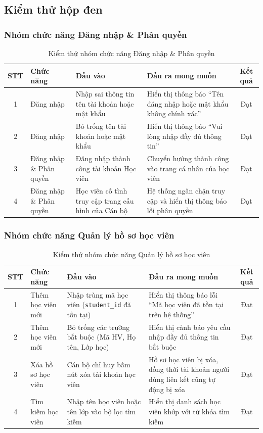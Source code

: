 \documentclass[../DoAn.tex]{subfiles}
\begin{document}
\subsection{Kiểm thử hộp đen}

\subsubsection{Nhóm chức năng Đăng nhập \& Phân quyền}
\begin{table}[H]
\centering
\begin{tabular}{|c|p{3.2cm}|p{3.5cm}|p{5.5cm}|c|}
\hline
\textbf{STT} & \textbf{Chức năng} & \textbf{Đầu vào} & \textbf{Đầu ra mong muốn} & \textbf{Kết quả} \\ \hline
1 & Đăng nhập & Nhập sai thông tin tên tài khoản hoặc mật khẩu & Hiển thị thông báo ``Tên đăng nhập hoặc mật khẩu không chính xác'' & Đạt \\ \hline
2 & Đăng nhập & Bỏ trống tên tài khoản hoặc mật khẩu & Hiển thị thông báo ``Vui lòng nhập đầy đủ thông tin'' & Đạt \\ \hline
3 & Đăng nhập \& Phân quyền & Đăng nhập thành công tài khoản Học viên & Chuyển hướng thành công vào trang cá nhân của học viên & Đạt \\ \hline
4 & Đăng nhập \& Phân quyền & Học viên cố tình truy cập trang cấu hình của Cán bộ & Hệ thống ngăn chặn truy cập và hiển thị thông báo lỗi phân quyền & Đạt \\ \hline
\end{tabular}
\caption{Kiểm thử nhóm chức năng Đăng nhập \& Phân quyền}
\label{tab:dang_nhap_rbac}
\end{table}

\subsubsection{Nhóm chức năng Quản lý hồ sơ học viên}
\begin{table}[H]
\centering
\begin{tabular}{|c|p{3.2cm}|p{3.5cm}|p{5.5cm}|c|}
\hline
\textbf{STT} & \textbf{Chức năng} & \textbf{Đầu vào} & \textbf{Đầu ra mong muốn} & \textbf{Kết quả} \\ \hline
1 & Thêm học viên mới & Nhập trùng mã học viên (\texttt{student\_id} đã tồn tại) & Hiển thị thông báo lỗi ``Mã học viên đã tồn tại trên hệ thống'' & Đạt \\ \hline
2 & Thêm học viên mới & Bỏ trống các trường bắt buộc (Mã HV, Họ tên, Lớp học) & Hiển thị cảnh báo yêu cầu nhập đầy đủ thông tin bắt buộc & Đạt \\ \hline
3 & Xóa hồ sơ học viên & Cán bộ chỉ huy bấm nút xóa tài khoản học viên & Hồ sơ học viên bị xóa, đồng thời tài khoản người dùng liên kết cũng tự động bị xóa & Đạt \\ \hline
4 & Tìm kiếm học viên & Nhập tên học viên hoặc tên lớp vào bộ lọc tìm kiếm & Hiển thị danh sách học viên khớp với từ khóa tìm kiếm & Đạt \\ \hline
\end{tabular}
\caption{Kiểm thử nhóm chức năng Quản lý hồ sơ học viên}
\label{tab:quan_ly_hoc_vien}
\end{table}
\end{document}
